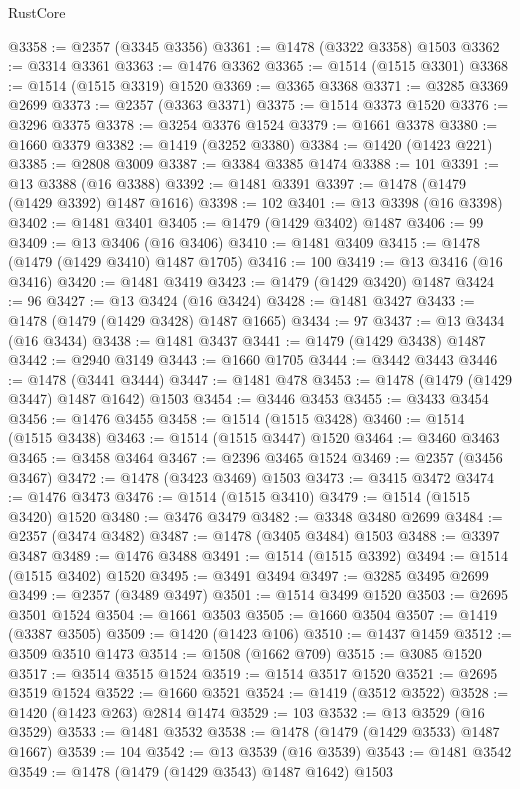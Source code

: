 \begin{lexlean}{RustCore}
\begin{coremodule}
@3358 := @2357 (@3345 @3356)
@3361 := @1478 (@3322 @3358) @1503
@3362 := @3314 @3361
@3363 := @1476 @3362
@3365 := @1514 (@1515 @3301)
@3368 := @1514 (@1515 @3319) @1520
@3369 := @3365 @3368
@3371 := @3285 @3369 @2699
@3373 := @2357 (@3363 @3371)
@3375 := @1514 @3373 @1520
@3376 := @3296 @3375
@3378 := @3254 @3376 @1524
@3379 := @1661 @3378
@3380 := @1660 @3379
@3382 := @1419 (@3252 @3380)
@3384 := @1420 (@1423 @221)
@3385 := @2808 @3009
@3387 := @3384 @3385 @1474
@3388 := 101
@3391 := @13 @3388 (@16 @3388)
@3392 := @1481 @3391
@3397 := @1478 (@1479 (@1429 @3392) @1487 @1616)
@3398 := 102
@3401 := @13 @3398 (@16 @3398)
@3402 := @1481 @3401
@3405 := @1479 (@1429 @3402) @1487
@3406 := 99
@3409 := @13 @3406 (@16 @3406)
@3410 := @1481 @3409
@3415 := @1478 (@1479 (@1429 @3410) @1487 @1705)
@3416 := 100
@3419 := @13 @3416 (@16 @3416)
@3420 := @1481 @3419
@3423 := @1479 (@1429 @3420) @1487
@3424 := 96
@3427 := @13 @3424 (@16 @3424)
@3428 := @1481 @3427
@3433 := @1478 (@1479 (@1429 @3428) @1487 @1665)
@3434 := 97
@3437 := @13 @3434 (@16 @3434)
@3438 := @1481 @3437
@3441 := @1479 (@1429 @3438) @1487
@3442 := @2940 @3149
@3443 := @1660 @1705
@3444 := @3442 @3443
@3446 := @1478 (@3441 @3444)
@3447 := @1481 @478
@3453 := @1478 (@1479 (@1429 @3447) @1487 @1642) @1503
@3454 := @3446 @3453
@3455 := @3433 @3454
@3456 := @1476 @3455
@3458 := @1514 (@1515 @3428)
@3460 := @1514 (@1515 @3438)
@3463 := @1514 (@1515 @3447) @1520
@3464 := @3460 @3463
@3465 := @3458 @3464
@3467 := @2396 @3465 @1524
@3469 := @2357 (@3456 @3467)
@3472 := @1478 (@3423 @3469) @1503
@3473 := @3415 @3472
@3474 := @1476 @3473
@3476 := @1514 (@1515 @3410)
@3479 := @1514 (@1515 @3420) @1520
@3480 := @3476 @3479
@3482 := @3348 @3480 @2699
@3484 := @2357 (@3474 @3482)
@3487 := @1478 (@3405 @3484) @1503
@3488 := @3397 @3487
@3489 := @1476 @3488
@3491 := @1514 (@1515 @3392)
@3494 := @1514 (@1515 @3402) @1520
@3495 := @3491 @3494
@3497 := @3285 @3495 @2699
@3499 := @2357 (@3489 @3497)
@3501 := @1514 @3499 @1520
@3503 := @2695 @3501 @1524
@3504 := @1661 @3503
@3505 := @1660 @3504
@3507 := @1419 (@3387 @3505)
@3509 := @1420 (@1423 @106)
@3510 := @1437 @1459
@3512 := @3509 @3510 @1473
@3514 := @1508 (@1662 @709)
@3515 := @3085 @1520
@3517 := @3514 @3515 @1524
@3519 := @1514 @3517 @1520
@3521 := @2695 @3519 @1524
@3522 := @1660 @3521
@3524 := @1419 (@3512 @3522)
@3528 := @1420 (@1423 @263) @2814 @1474
@3529 := 103
@3532 := @13 @3529 (@16 @3529)
@3533 := @1481 @3532
@3538 := @1478 (@1479 (@1429 @3533) @1487 @1667)
@3539 := 104
@3542 := @13 @3539 (@16 @3539)
@3543 := @1481 @3542
@3549 := @1478 (@1479 (@1429 @3543) @1487 @1642) @1503

\end{coremodule}
\end{lexlean}
